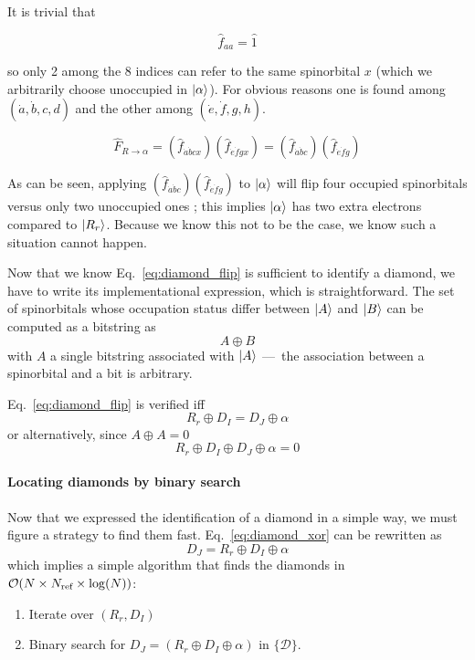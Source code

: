\documentclass[./thesis.tex]{subfiles}
\begin{document}
It is trivial that

\begin{equation}
\hat f_{aa} = \hat 1
\end{equation}

so only 2 among the 8 indices can refer to the same spinorbital $x$ (which we arbitrarily choose unoccupied in ${\ket{\alpha}}$). For obvious reasons one is found among $(\dot a,\dot b,c,d)$ and the other among $(\dot e,\dot f,g,h)$.

\begin{equation}
\hat F_{R \rightarrow \alpha} = (\hat f_{\dot a \dot bcx})(\hat f_{\dot e \dot fgx}) = (\hat f_{\dot a \dot bc})(\hat f_{\dot e \dot fg})
\end{equation}

As can be seen, applying $(\hat f_{\dot a \dot bc})(\hat f_{\dot e \dot fg})$ to ${\ket{\alpha}}$ will flip four occupied spinorbitals versus only two unoccupied ones ; this implies ${\ket{\alpha}}$ has two extra electrons compared to $\ket {R_r}$. Because we know this not to be the case, we know such a situation cannot happen.

Now that we know Eq.~\eqref{eq:diamond_flip} is sufficient to identify a diamond, we have to write its implementational expression, which is straightforward. The set of spinorbitals whose occupation status differ between $\ket A$ and $\ket B$ can be computed as a bitstring as
\begin{equation}
A \oplus B
\end{equation}
with $A$ a single bitstring associated with $\ket A$ ---~the association between a spinorbital and a bit is arbitrary.

Eq.~\eqref{eq:diamond_flip} is verified iff
\begin{equation}
R_r \oplus D_I = D_J \oplus \alpha
\end{equation}
or alternatively, since $A \oplus A = 0$
\begin{equation}
R_r \oplus D_I \oplus D_J \oplus \alpha = 0
\label{eq:diamond_xor}
\end{equation}

\paragraph{Locating diamonds by binary search}
Now that we expressed the identification of a diamond in a simple way, we must figure a strategy to find them fast. Eq.~\eqref{eq:diamond_xor} can be rewritten as
\begin{equation}
D_J = R_r \oplus D_I \oplus \alpha
\end{equation}
which implies a simple algorithm that finds the diamonds in $\mathcal{O}(N \times {N_\text{ref}} \times \log(N))$:
\begin{enumerate}
\item
Iterate over $(R_r, D_I)$
\item
Binary search for $D_J = (R_r \oplus D_I \oplus \alpha)$ in $\{\mathcal{D}\}$. 
\end{enumerate}
\end{document}
